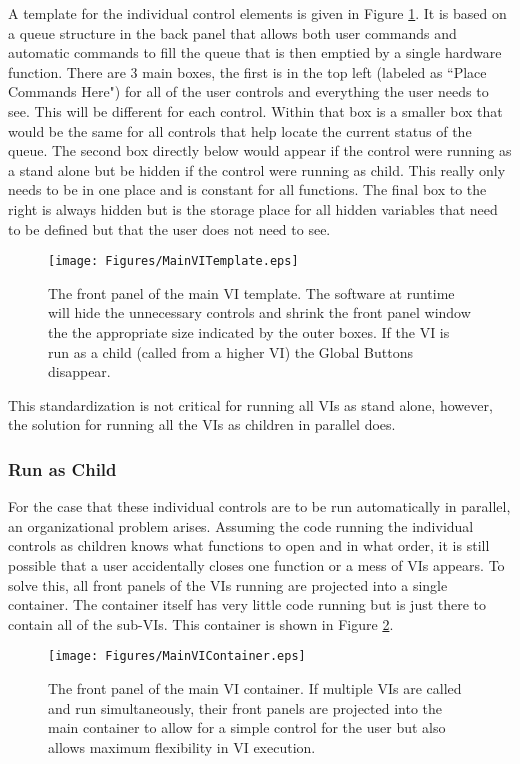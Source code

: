 A template for the individual control elements is given in Figure \ref{Fig:VITemplate}. It is based on a queue structure in the back panel that allows both user commands and automatic commands to fill the queue that is then emptied by a single hardware function. There are 3 main boxes, the first is in the top left (labeled as ``Place Commands Here") for all of the user controls and everything the user needs to see. This will be different for each control. Within that box is a smaller box that would be the same for all controls that help locate the current status of the queue. The second box directly below would appear if the control were running as a stand alone but be hidden if the control were running as child. This really only needs to be in one place and is constant for all functions. The final box to the right is always hidden but is the storage place for all hidden variables that need to be defined but that the user does not need to see. 

\begin{figure}[!h]\centering
\texttt{[image: Figures/MainVITemplate.eps]}
\caption{The front panel of the main VI template. The software at runtime will hide the unnecessary controls and shrink the front panel window the the appropriate size indicated by the outer boxes. If the VI is run as a child (called from a higher VI) the Global Buttons disappear. }\label{Fig:VITemplate}
\end{figure}

This standardization is not critical for running all VIs as stand alone, however, the solution for running all the VIs as children in parallel does. 

\subsubsection{Run as Child}

For the case that these individual controls are to be run automatically in parallel, an organizational problem arises. Assuming the code running the individual controls as children knows what functions to open and in what order, it is still possible that a user accidentally closes one function or a mess of VIs appears. To solve this, all front panels of the VIs running are projected into a single container. The container itself has very little code running but is just there to contain all of the sub-VIs. This container is shown in Figure \ref{Fig:VIContainer}.

\begin{figure}[!h]\centering
\texttt{[image: Figures/MainVIContainer.eps]}
\caption{The front panel of the main VI container. If multiple VIs are called and run simultaneously, their front panels are projected into the main container to allow for a simple control for the user but also allows maximum flexibility in VI execution.}\label{Fig:VIContainer}
\end{figure}

